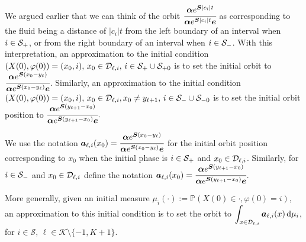 We argued earlier that we can think of the orbit \(\cfrac{\boldsymbol \alpha e^{\boldsymbol{S}|c_i|t}}{\boldsymbol \alpha e^{\boldsymbol{S}|c_i|t}\boldsymbol e}\) as corresponding to the fluid being a distance of \(|c_i|t\) from the left boundary of an interval when \(i\in\mathcal{S}_+\), or from the right boundary of an interval when \(i\in\mathcal{S}_-\). With this interpretation, an approximation to the initial condition \((X(0),\varphi(0))=(x_0,i),\,x_0\in\mathcal D_{\ell,i},\,i\in\mathcal S_+\cup\mathcal{S}_{+0}\) is to set the initial orbit to \(\cfrac{\boldsymbol \alpha e^{\boldsymbol{S}(x_0-y_\ell)}}{\boldsymbol \alpha e^{\boldsymbol{S}(x_0-y_\ell)}\boldsymbol e}\). Similarly, an approximation to the initial condition \((X(0),\varphi(0))=(x_0,i), \,x_0\in\mathcal D_{\ell,i}, x_0\neq y_{\ell+1},\,i\in\mathcal S_-\cup\mathcal{S}_{-0}\) is to set the initial orbit position to \(\cfrac{\boldsymbol \alpha e^{\boldsymbol{S}(y_{\ell+1}-x_0)}}{\boldsymbol \alpha e^{\boldsymbol{S}(y_{\ell+1}-x_0)}\boldsymbol e}.\) 

We use the notation \(\boldsymbol a_{\ell,i}(x_0) = \cfrac{\boldsymbol \alpha e^{\boldsymbol{S}(x_0-y_\ell)}}{\boldsymbol \alpha e^{\boldsymbol{S}(x_0-y_\ell)}\boldsymbol e}\) for the initial orbit position corresponding to \(x_0\) when the initial phase is \(i\in\mathcal{S}_+\) and \(x_0\in\mathcal{D}_{\ell,i}\). Similarly, for \(i\in\mathcal{S}_-\) and \(x_0\in\mathcal{D}_{\ell,i}\) define the notation \(\boldsymbol a_{\ell,i}(x_0) = \cfrac{\boldsymbol \alpha e^{\boldsymbol{S}(y_{\ell+1} - x_0)}}{\boldsymbol \alpha e^{\boldsymbol{S}(y_{\ell+1}-x_0)}\boldsymbol e}\). 

More generally, given an initial measure \(\mu_i(\cdot):= \mathbb P(X(0)\in\cdot,\varphi(0)=i)\), an approximation to this initial condition is to set the orbit to \(\displaystyle\int_{x\in\mathcal{D}_{\ell,i}}\boldsymbol a_{\ell,i} (x) \, \mathrm{d} \mu_i\), for \(i\in\mathcal S,\, \ell\in\mathcal K\setminus\{-1,K+1\}\). 

